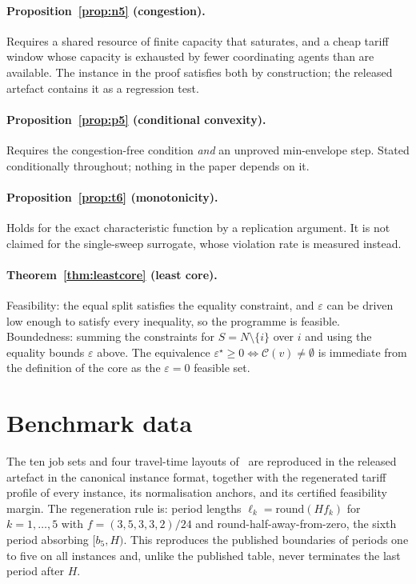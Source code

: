 \documentclass[preprint, 3p, review, 12pt]{elsarticle}
\theoremstyle{definition}
\begin{document}
\paragraph{Proposition~\ref{prop:n5} (congestion).} Requires a shared resource of finite
capacity that saturates, and a cheap tariff window whose capacity is exhausted by fewer
coordinating agents than are available. The instance in the proof satisfies both by
construction; the released artefact contains it as a regression test.

\paragraph{Proposition~\ref{prop:p5} (conditional convexity).} Requires the congestion-free
condition \emph{and} an unproved min-envelope step. Stated conditionally throughout; nothing
in the paper depends on it.

\paragraph{Proposition~\ref{prop:t6} (monotonicity).} Holds for the exact characteristic
function by a replication argument. It is not claimed for the single-sweep surrogate, whose
violation rate is measured instead.

\paragraph{Theorem~\ref{thm:leastcore} (least core).} Feasibility: the equal split satisfies
the equality constraint, and $\varepsilon$ can be driven low enough to satisfy every
inequality, so the programme is feasible. Boundedness: summing the constraints for
$S=N\setminus\{i\}$ over $i$ and using the equality bounds $\varepsilon$ above. The
equivalence $\varepsilon^\star\ge0 \Leftrightarrow \mathcal{C}(v)\neq\emptyset$ is immediate
from the definition of the core as the $\varepsilon=0$ feasible set.

\section{Benchmark data}
\label{app:bench}
The ten job sets and four travel-time layouts of~\citet{bilge1995} are reproduced in the
released artefact in the canonical instance format, together with the regenerated tariff
profile of every instance, its normalisation anchors, and its certified feasibility margin.
The regeneration rule is: period lengths $\ell_k=\mathrm{round}(H f_k)$ for $k=1,\dots,5$ with
$f=(3,5,3,3,2)/24$ and round-half-away-from-zero, the sixth period absorbing
$[b_5,H)$. This reproduces the published boundaries of periods one to five on all
 instances and, unlike the published table, never terminates the last
period after $H$.



\end{document}
